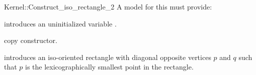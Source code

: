 \begin{ccRefFunctionObjectConcept}{Kernel::Construct_iso_rectangle_2}
A model for this must provide:



\ccHidden {}
             {introduces an uninitialized variable .}

\ccHidden {}
            {copy constructor.}

            {introduces an iso-oriented rectangle  with diagonal
             opposite vertices $p$ and $q$ such that $p$ is the
             lexicographically smallest point in the rectangle.}

\end{ccRefFunctionObjectConcept}

